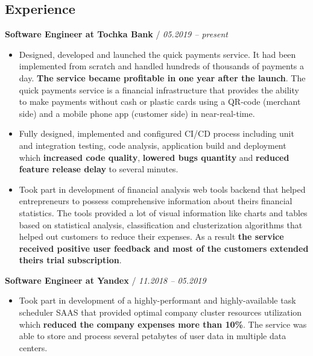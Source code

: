 \documentclass[a4paper,10pt]{article}
\newcommand{\notice}[1]{{\textcolor{dark}{\textbf{#1}}}}
\newcommand{\info}[1]{{\textcolor{darkdark}{\textbf{#1}}}}
\begin{document}
\subsection*{Experience}

    \begin{adjustwidth}{10pt}{10pt}

        \notice{Software Engineer at Tochka Bank} / \textit{05.2019 – present}

        \begin{itemize}

        \item Designed, developed and launched the quick payments service. It had been implemented from scratch and handled hundreds of thousands of payments a day. \info{The service became profitable in one year after the launch}. The quick payments service is a financial infrastructure that provides the ability to make payments without cash or plastic cards using a QR-code (merchant side) and a mobile phone app (customer side) in near-real-time.

        \item Fully designed, implemented and configured CI/CD process including unit and integration testing, code analysis, application build and deployment which \info{increased code quality}, \info{lowered bugs quantity} and \info{reduced feature release delay} to several minutes.

        \item Took part in development of financial analysis web tools backend that helped entrepreneurs to possess comprehensive information about theirs financial statistics. The tools provided a lot of visual information like charts and tables based on statistical analysis, classification and clusterization algorithms that helped out customers to reduce their expenses. As a result \info{the service received positive user feedback and most of the customers extended theirs trial subscription}.

        \end{itemize}


        \notice{Software Engineer at Yandex} / \textit{11.2018 – 05.2019}

        \begin{itemize}

        \item Took part in development of a highly-performant and highly-available task scheduler SAAS that provided optimal company cluster resources utilization which \info{reduced the company expenses more than 10\%}. The service was able to store and process several petabytes of user data in multiple data centers.


\end{itemize}
\end{adjustwidth}
\end{document}
